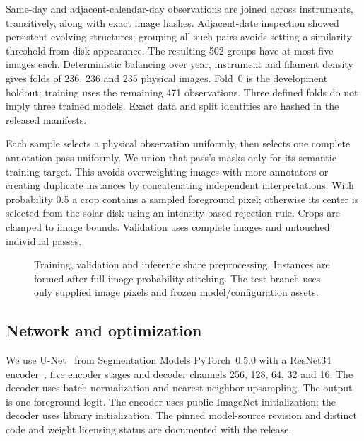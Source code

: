 \documentclass[sigconf]{acmart}
\begin{document}
Same-day and adjacent-calendar-day observations are joined across instruments, transitively, along with exact image hashes. Adjacent-date inspection showed persistent evolving structures; grouping all such pairs avoids setting a similarity threshold from disk appearance. The resulting 502 groups have at most five images each. Deterministic balancing over year, instrument and filament density gives folds of 236, 236 and 235 physical images. Fold~0 is the development holdout; training uses the remaining 471 observations. Three defined folds do not imply three trained models. Exact data and split identities are hashed in the released manifests.

Each sample selects a physical observation uniformly, then selects one complete annotation pass uniformly. We union that pass's masks only for its semantic training target. This avoids overweighting images with more annotators or creating duplicate instances by concatenating independent interpretations. With probability 0.5 a crop contains a sampled foreground pixel; otherwise its center is selected from the solar disk using an intensity-based rejection rule. Crops are clamped to image bounds. Validation uses complete images and untouched individual passes.

\begin{figure}[t]
\centering
{}
\caption{Training, validation and inference share preprocessing. Instances are formed after full-image probability stitching. The test branch uses only supplied image pixels and frozen model/configuration assets.}
\label{fig:pipeline}
\end{figure}

\subsection{Network and optimization}
We use U-Net~\cite{ronneberger2015unet} from Segmentation Models PyTorch~0.5.0 with a ResNet34 encoder~\cite{he2016resnet}, five encoder stages and decoder channels 256, 128, 64, 32 and 16. The decoder uses batch normalization and nearest-neighbor upsampling. The output is one foreground logit. The encoder uses public ImageNet initialization; the decoder uses library initialization. The pinned model-source revision and distinct code and weight licensing status are documented with the release.
\end{document}
